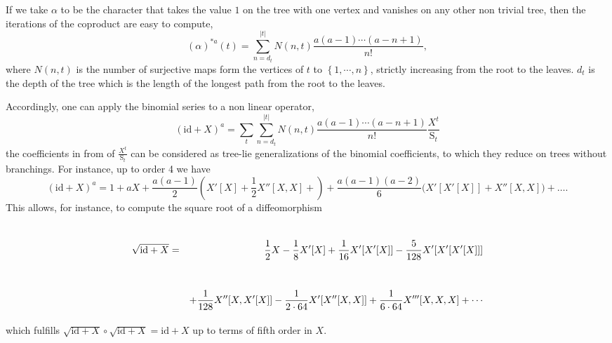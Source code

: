 \documentclass[10pt,here,feynmf]{article}
\begin{document}
If we take $\alpha$ to be the character that takes the value $1$ on the tree with one vertex and vanishes on any other non trivial tree, then the iterations of the coproduct are easy to compute,
\begin{equation}
(\alpha)^{\ast a}(t)=\sum_{n=d_{t}}^{|t|}N(n,t)\frac{a(a-1)\cdots (a-n+1)}{n!},
\end{equation}
where $N(n,t)$ is the number of surjective maps form the vertices of $t$ to $\left\{1,\cdots,n\right\}$, strictly increasing from the root to the leaves. $d_{t}$ is the depth of the tree which is the length of the longest path from the root to the leaves. 

Accordingly, one can apply the binomial series to a non linear operator,
\begin{equation}
(\mathrm{id}+X)^{a}=\sum_{t}
\sum_{n=d_{t}}^{|t|}N(n,t)\frac{a(a-1)\cdots (a-n+1)}{n!}
\frac{X^{t}}{\mathrm{S}_{t}}\label{binomX}
\end{equation}
the coefficients in from of $\frac{X^{t}}{\mathrm{S}_{t}}$ can be considered as tree-lie generalizations of the binomial coefficients, to which they reduce on trees without branchings.
For instance, up to order 4 we have
\begin{equation}
(\mathrm{id}+X)^{a}=1+aX+\frac{a(a-1)}{2}\left(X'[X]+\frac{1}{2}X''[X,X]+\right)+\frac{a(a-1)(a-2)}{6}\bigg( X'[X'[X]]+X''[X,X]\bigg)+\dots.
\end{equation}
This allows, for instance, to compute the square root of a diffeomorphism 
\begin{eqnarray}
\renewcommand{\baselinestretch}{4}
\sqrt{\mathrm{id}+X}&=&\frac{1}{2}X-\frac{1}{8}X'[X]+\frac{1}{16}X'[X'[X]]-\frac{5}{128}X'[X'[X'[X]]]\cr
&&+\frac{1}{128}X''[X,X'[X]]-\frac{1}{2\cdot 64}X'[X''[X,X]]+\frac{1}{6\cdot 64}X'''[X,X,X]+\cdots
\end{eqnarray}
which fulfills $\sqrt{\mathrm{id}+X}\circ\sqrt{\mathrm{id}+X}=\mathrm{id}+X$ up to terms of fifth order in $X$. 
\end{document}
